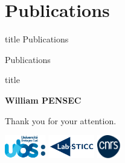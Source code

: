 \section*{Publications}

\begin{frame}
    \vfill
    \centering
    \begin{beamercolorbox}[sep=8pt,center,shadow=true,rounded=true]{title}
         Publications
    \end{beamercolorbox}
    \vfill
\end{frame}

\begin{frame}[noframenumbering]{Publications}

\end{frame}
\begin{frame}
    \centering

    \vfill
    \begin{beamercolorbox}[sep=8pt,center,shadow=true,rounded=true]{title}
        \NoHyper\large\inserttitle\par\endNoHyper
        \vspace{.5cm}
        \NoHyper\large\insertsubtitle\par\endNoHyper
    \end{beamercolorbox}
    \vfill

    \large \textbf{William PENSEC}

    \vfill

    \Large Thank you for your attention.

    \vfill
    \includegraphics[height=1cm]{img/logo/ubs.png}
    \hspace{1cm}
    \includegraphics[height=1cm]{img/logo/labsticc.pdf}
    \hspace{1cm}
    \includegraphics[height=1cm]{img/logo/cnrs.pdf}
\end{frame}
